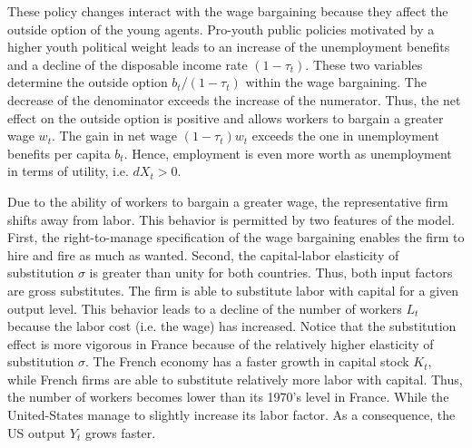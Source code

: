 These policy changes interact with the wage bargaining because they affect the outside option of the young agents. 
Pro-youth public policies motivated by a higher youth political weight leads to an increase of the unemployment benefits and a decline of the disposable income rate $(1-\tau_t)$. These two variables determine the outside option $b_t/(1-\tau_t)$ within the wage bargaining. The decrease of the denominator exceeds the increase of the numerator. Thus, the net effect on the outside option is positive and allows workers to bargain a greater wage $w_t$. The gain in net wage $(1-\tau_t)w_t$ exceeds the one in unemployment benefits per capita $b_t$. Hence, employment is even more worth as unemployment in terms of utility, i.e. $dX_t > 0$.

Due to the ability of workers to bargain a greater wage, the representative firm shifts away from labor. 
This behavior is permitted by two features of the model. First, the right-to-manage specification of the wage bargaining enables the firm to hire and fire as much as wanted. Second, the capital-labor elasticity of substitution $\sigma$ is greater than unity for both countries. Thus, both input factors are gross substitutes. The firm is able to substitute labor with capital for a given output level. This behavior leads to a decline of the number of workers $L_t$ because the labor cost (i.e. the wage) has increased. Notice that the substitution effect is more vigorous in France because of the relatively higher elasticity of substitution $\sigma$. The French economy has a faster growth in capital stock $K_t$, while French firms are able to substitute relatively more labor with capital. Thus, the number of workers becomes lower than its 1970's level in France. While the United-States manage to slightly increase its labor factor. As a consequence, the US output $Y_t$ grows faster.

